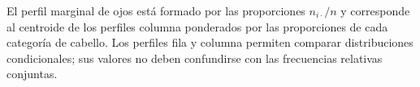 El perfil marginal de ojos está formado por las proporciones $n_{i\cdot}/n$ y corresponde al centroide de los perfiles columna ponderados por las proporciones de cada categoría de cabello. Los perfiles fila y columna permiten comparar distribuciones condicionales; sus valores no deben confundirse con las frecuencias relativas conjuntas.
